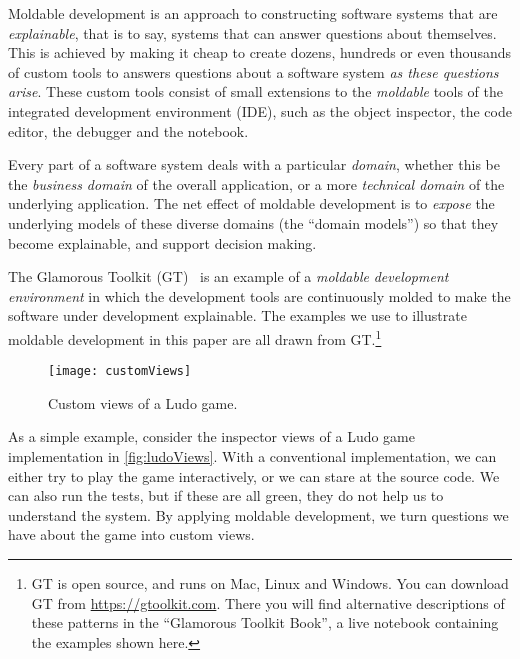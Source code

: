 \documentclass[acmsmall,screen,authorversion,nonacm]{acmart} %
\newcommand\cp[1]{\nbe{Cesare}{#1}{olive}} %
\newcommand\ws[1]{\nbe{Workshop}{#1}{teal}} %
\begin{document}
Moldable development is an approach to constructing software systems that are \emph{explainable}, that is to say, systems that can answer questions about themselves.
This is achieved by making it cheap to create dozens, hundreds or even thousands of custom tools to answers questions about a software system \emph{as these questions arise}.
These custom tools consist of small extensions to the \emph{moldable} tools of the integrated development environment (IDE), such as the object inspector, the code editor, the debugger and the notebook.

Every part of a software system deals with a particular \emph{domain}, whether this be the \emph{business domain} of the overall application, or a more \emph{technical domain}  of the underlying application.
The net effect of moldable development is to \emph{expose} the underlying models of these diverse domains (\ie the ``domain models'') 
so that they become explainable, and support decision making.

The Glamorous Toolkit (GT)~\cite{feenk23a} is an example of a \emph{moldable} \emph{development} \emph{environment} in which the development tools are continuously molded to make the software under development explainable.
The examples we use to illustrate moldable development in this paper are all drawn from GT.\footnote{GT is open source, and runs on Mac, Linux and Windows. You can download GT from \url{https://gtoolkit.com}.
There you will find alternative descriptions of these patterns in the ``Glamorous Toolkit Book'', a live notebook containing the examples shown here.}

\begin{figure}[h]
  \texttt{[image: customViews]}
  \caption{Custom views of a Ludo game.}
  \label{fig:ludoViews}
\end{figure}

As a simple example, consider the inspector views of a Ludo game implementation in \autoref{fig:ludoViews}.
With a conventional implementation, we can either try to play the game interactively, or we can stare at the source code.
We can also run the tests, but if these are all green, they do not help us to understand the system.
By applying moldable development, we turn questions we have about the game into custom views.
\end{document}
